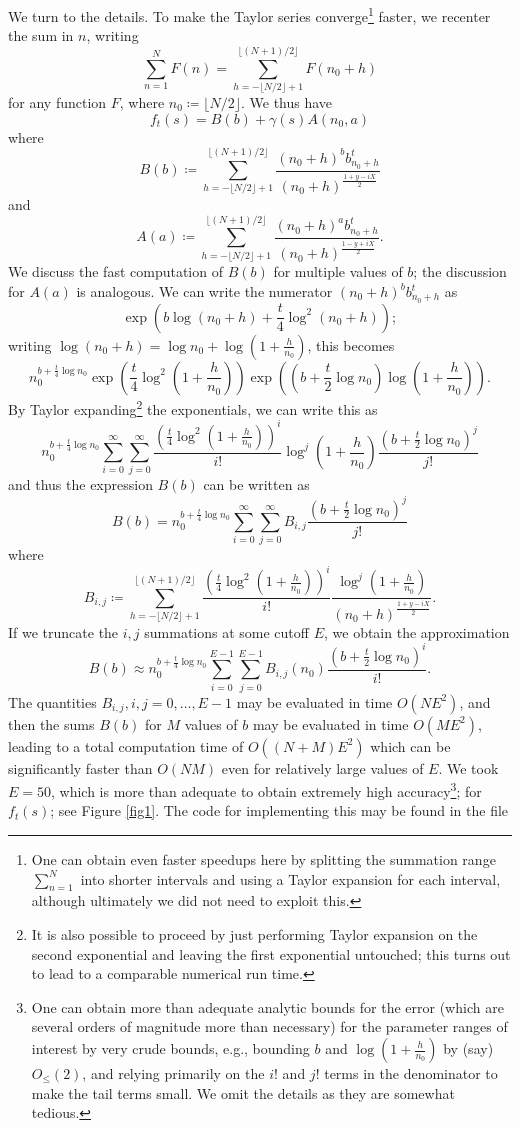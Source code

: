 \documentclass[a4paper,11pt,twoside]{amsart}
\begin{document}
We turn to the details.  To make the Taylor series converge\footnote{One can obtain even faster speedups here by splitting the summation range $\sum_{n=1}^N$ into shorter intervals and using a Taylor expansion for each interval, although ultimately we did not need to exploit this.} faster, we recenter the sum in $n$, writing
$$ \sum_{n=1}^N F(n) = \sum_{h=-\lfloor N/2\rfloor+1}^{\lfloor (N+1)/2\rfloor} F(n_0 + h)$$
for any function $F$, where $n_0 \coloneqq \lfloor N/2 \rfloor$.  We thus have
$$ f_t(s) = B(b) + \gamma(s) A(n_0,a)$$
where
$$ B(b) \coloneqq \sum_{h=-\lfloor N/2\rfloor+1}^{\lfloor (N+1)/2\rfloor} \frac{(n_0+h)^b b_{n_0+h}^t}{(n_0+h)^{\frac{1+y-iX}{2}}}$$
and
$$ A(a) \coloneqq \sum_{h=-\lfloor N/2\rfloor+1}^{\lfloor (N+1)/2\rfloor} \frac{(n_0+h)^a b_{n_0+h}^t}{(n_0+h)^{\frac{1-y+iX}{2}}}.$$
We discuss the fast computation of $B(b)$ for multiple values of $b$; the discussion for $A(a)$ is analogous.  We can write the numerator $(n_0+h)^b b_{n_0+h}^t$ as
$$ \exp( b \log(n_0+h) + \frac{t}{4} \log^2(n_0+h) );$$
writing $\log(n_0+h) = \log n_0 + \log(1+\frac{h}{n_0})$, this becomes
$$ n_0^{b + \frac{t}{4} \log n_0} \exp( \frac{t}{4} \log^2(1+\frac{h}{n_0}) ) \exp( (b + \frac{t}{2} \log n_0) \log(1+\frac{h}{n_0}) ).$$
By Taylor expanding\footnote{It is also possible to proceed by just performing Taylor expansion on the second exponential and leaving the first exponential untouched; this turns out to lead to a comparable numerical run time.} the exponentials, we can write this as
$$ n_0^{b + \frac{t}{4} \log n_0} \sum_{i=0}^\infty \sum_{j=0}^\infty \frac{( \frac{t}{4} \log^2(1+\frac{h}{n_0}) )^i}{i!} \log^j(1+\frac{h}{n_0}) \frac{(b+\frac{t}{2} \log n_0)^j}{j!}$$
and thus the expression $B(b)$ can be written as
$$ B(b) = n_0^{b + \frac{t}{4} \log n_0} \sum_{i=0}^\infty \sum_{j=0}^\infty B_{i,j} \frac{(b+\frac{t}{2} \log n_0)^j}{j!}$$
where
$$ B_{i,j} \coloneqq \sum_{h=-\lfloor N/2\rfloor+1}^{\lfloor (N+1)/2\rfloor} \frac{( \frac{t}{4} \log^2(1+\frac{h}{n_0}) )^i}{i!} \frac{\log^j(1+\frac{h}{n_0})}{(n_0+h)^{\frac{1+y-iX}{2}}}.$$
If we truncate the $i,j$ summations at some cutoff $E$, we obtain the approximation
$$ B(b) \approx n_0^{b + \frac{t}{4} \log n_0} \sum_{i=0}^{E-1} \sum_{j=0}^{E-1} B_{i,j}(n_0) \frac{(b+\frac{t}{2} \log n_0)^i}{i!}.$$
The quantities $B_{i,j}, i,j=0,\dots,{E-1}$ may be evaluated in time $O(N E^2)$, and then the sums $B(b)$ for $M$ values of $b$ may be evaluated in time $O(ME^2)$, leading to a total computation time of $O((N+M) E^2)$ which can be significantly faster than $O(NM)$ even for relatively large values of $E$.  We took $E=50$, which is more than adequate to obtain extremely high accuracy\footnote{One can obtain more than adequate analytic bounds for the error (which are several orders of magnitude more than necessary) for the parameter ranges of interest by very crude bounds, e.g., bounding $b$ and $\log(1+\frac{h}{n_0})$ by (say) $O_{\leq}(2)$, and relying primarily on the $i!$ and $j!$ terms in the denominator to make the tail terms small.  We omit the details as they are somewhat tedious.}; for $f_t(s)$; see Figure \ref{fig1}.  The code for implementing this may be found in the file
\end{document}
